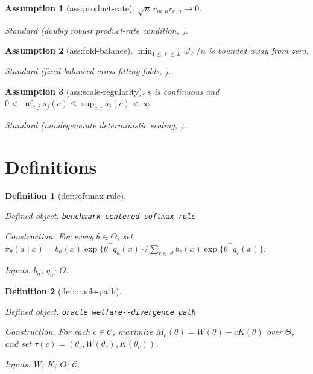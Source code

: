 \documentclass{article}
\newtheorem{assumption}{Assumption}
\newtheorem{definition}{Definition}
\begin{document}
\begin{assumption}[ass:product-rate]\label{ass:product-rate}
\(\sqrt n\,r_{m,n}r_{e,n}\to0\).
\par\smallskip\noindent\emph{Standard} (doubly robust product-rate condition, \cite{ChernozhukovEtAl2018DML}).
\end{assumption}

\begin{assumption}[ass:fold-balance]\label{ass:fold-balance}
\(\min_{1\le\ell\le L}|\mathcal I_\ell|/n\) is bounded away from zero.
\par\smallskip\noindent\emph{Standard} (fixed balanced cross-fitting folds, \cite{ChernozhukovEtAl2018DML}).
\end{assumption}

\begin{assumption}[ass:scale-regularity]\label{ass:scale-regularity}
\(s\) is continuous and \(0<\inf_{c,j}s_j(c)\le\sup_{c,j}s_j(c)<\infty\).
\par\smallskip\noindent\emph{Standard} (nondegenerate deterministic scaling, \cite{BelloniChernozhukovChetverikovWei2018}).
\end{assumption}

\section{Definitions}

\begin{definition}[def:softmax-rule]\label{def:softmax-rule}
\par\smallskip\noindent\emph{Defined object.} \texttt{benchmark-\allowbreak{}centered softmax rule}
\par\smallskip\noindent\emph{Construction.} For every \(\theta\in\Theta\), set \(\pi_\theta(a\mid x)=b_a(x)\exp\{\theta^\top q_a(x)\}/\sum_{r\in\mathcal A}b_r(x)\exp\{\theta^\top q_r(x)\}\).
\par\smallskip\noindent\emph{Inputs.} \(b_a\); \(q_a\); \(\Theta\).
\end{definition}

\begin{definition}[def:oracle-path]\label{def:oracle-path}
\par\smallskip\noindent\emph{Defined object.} \texttt{oracle welfare-\allowbreak{}-\allowbreak{}divergence path}
\par\smallskip\noindent\emph{Construction.} For each \(c\in\mathcal C\), maximize \(M_c(\theta)=W(\theta)-cK(\theta)\) over \(\Theta\), and set \(\tau(c)=(\theta_c,W(\theta_c),K(\theta_c))\).
\par\smallskip\noindent\emph{Inputs.} \(W\); \(K\); \(\Theta\); \(\mathcal C\).
\end{definition}
\end{document}
